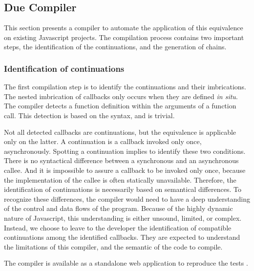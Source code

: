 \subsection{Due Compiler} \label{chapter5:due:compiler}

This section presents a compiler to automate the application of this equivalence on existing Javascript projects.
The compilation process contains two important steps, the identification of the continuations, and the generation of chains.

\subsubsection{Identification of continuations}

The first compilation step is to identify the continuations and their imbrications.
The nested imbrication of callbacks only occurs when they are defined \textit{in situ}.
The compiler detects a function definition within the arguments of a function call.
This detection is based on the syntax, and is trivial.


Not all detected callbacks are continuations, but the equivalence is applicable only on the latter.
A continuation is a callback invoked only once, asynchronously.
Spotting a continuation implies to identify these two conditions.
There is no syntactical difference between a synchronous and an asynchronous callee.
And it is impossible to assure a callback to be invoked only once, because the implementation of the callee is often statically unavailable.
Therefore, the identification of continuations is necessarily based on semantical differences.
To recognize these differences, the compiler would need to have a deep understanding of the control and data flows of the program.
Because of the highly dynamic nature of Javascript, this understanding is either unsound, limited, or complex.
Instead, we choose to leave to the developer the identification of compatible continuations among the identified callbacks.
They are expected to understand the limitations of this compiler, and the semantic of the code to compile.

The compiler is available as a standalone web application to reproduce the tests .


